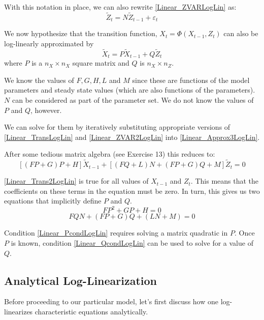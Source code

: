 \documentclass[letterpaper,12pt]{article}
\newcommand{\ve}{\varepsilon}
\theoremstyle{definition}
\begin{document}
\begin{spacing}{1.5}
		With this notation in place, we can also rewrite \eqref{Linear_ZVARLogLin} as:
		\begin{equation}\label{Linear_ZVAR2LogLin}
		\tilde Z_t =  N \tilde Z_{t-1} + \ve_t
		\end{equation}

		We now hypothesize that the transition function, $X_{t} = \Phi(X_{t-1},Z_t)$ can also be log-linearly approximated by
		\begin{equation}\label{Linear_TransLogLin}
		\tilde X_{t} =  P \tilde X_{t-1} + Q \tilde Z_t
		\end{equation}
		where $P$ is a $n_X \times n_X$ square matrix and $Q$ is $n_X \times n_Z$.

		We know the values of $F,G,H,L$ and $M$ since these are functions of the model parameters and steady state values (which are also functions of the parameters). $N$ can be considered as part of the parameter set. We do not know the values of $P$ and $Q$, however.

		We can solve for them by iteratively substituting appropriate versions of \eqref{Linear_TransLogLin} and \eqref{Linear_ZVAR2LogLin} into \eqref{Linear_Approx3LogLin}.

		After some tedious matrix algebra (see Exercise 13) this reduces to:
		\begin{equation}\label{Linear_Trans2LogLin}
		[(FP+G)P+H]\tilde X_{t-1} + [(FQ+L)N+(FP+G)Q+M]\tilde Z_t = 0
		\end{equation}

		\eqref{Linear_Trans2LogLin} is true for all values of $X_{t-1}$ and $Z_t$. This means that the coefficients on these terms in the equation must be zero. In turn, this gives us two equations that implicitly define $P$ and $Q$.
		\begin{equation}\label{Linear_PcondLogLin}
		FP^2+GP+H = 0
		\end{equation}
		\begin{equation}\label{Linear_QcondLogLin}
		FQN +(FP+G)Q +(LN+M) = 0
		\end{equation}

		Condition \eqref{Linear_PcondLogLin} requires solving a matrix quadratic in $P$. Once $P$ is known, condition \eqref{Linear_QcondLogLin} can be used to solve for a value of $Q$.

	\subsection{Analytical Log-Linearization}
		Before proceeding to our particular model, let's first discuss how one log-linearizes characteristic equations analytically.


\end{spacing}
\end{document}
